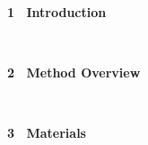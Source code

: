 \documentclass[portrait,a0,final]{a0poster} %
\def\exMinipage{787mm}
\def\exHalfMinipage{393mm}
\def\exSubHalfMinipage{385mm}
\begin{document}
{{{\begin{minipage}[t]{\exMinipage}
\begin{minipage}[t]{\exHalfMinipage}
\begin{minipage}[t]{\exHalfMinipage}%
\LARGE{\textcolor{\backgroundcolortitle}{ \bf 1 \ Introduction}}\\[-10pt]
\begin{minipage}[t]{\exSubHalfMinipage}
\begin{mdframed}[style=smallframe-color]
\introtext
\end{mdframed}
\end{minipage} 
\end{minipage}%
\\[40pt]
\begin{minipage}[t]{\exHalfMinipage}%
\LARGE {\textcolor{\backgroundcolortitle}{\bf 2 \ Method Overview}}\\[-10pt]
\begin{minipage}[t]{\exSubHalfMinipage}
\begin{mdframed}[style=smallframe-white]
\methodtext
\end{mdframed}
\end{minipage}
\end{minipage}%
\\[40pt]
\begin{minipage}[t]{\exHalfMinipage}%
\LARGE {\textcolor{\backgroundcolortitle}{  \bf 3 \ Materials}}\\[-10pt]
\begin{minipage}[t]{\exSubHalfMinipage}
\begin{mdframed}[style=smallframe-white]
\materialstext
\end{mdframed}
\end{minipage}
\end{minipage}%
\\[40pt]
\end{minipage}%
\hspace{0.7cm}
\begin{minipage}[t]{\exHalfMinipage}


\end{minipage}
\end{minipage}}}}
\end{document}
